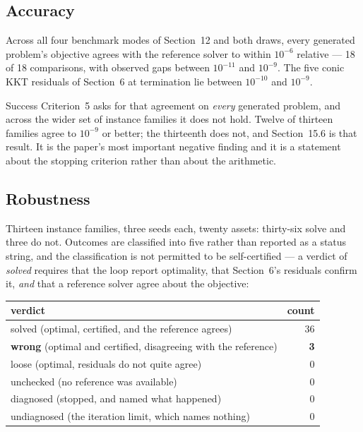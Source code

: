 \documentclass[11pt,a4paper]{article}
\begin{document}
\subsection{Accuracy}

Across all four benchmark modes of Section~12 and both draws, every
generated problem's objective agrees with the reference solver to
within $10^{-6}$ relative --- 18 of 18 comparisons, with observed gaps
between $10^{-11}$ and $10^{-9}$. The five conic KKT residuals of
Section~6 at termination lie between $10^{-10}$ and $10^{-9}$.

Success Criterion~5 asks for that agreement on \emph{every} generated
problem, and across the wider set of instance families it does not
hold. Twelve of thirteen families agree to $10^{-9}$ or better; the
thirteenth does not, and Section~15.6 is that result. It is the
paper's most important negative finding and it is a statement about
the stopping criterion rather than about the arithmetic.

\subsection{Robustness}

Thirteen instance families, three seeds each, twenty assets:
thirty-six solve and three do not. Outcomes are classified into five
rather than reported as a status string, and the classification is not
permitted to be self-certified --- a verdict of \emph{solved} requires
that the loop report optimality, that Section~6's residuals confirm
it, \emph{and} that a reference solver agree about the objective:

\begin{center}
\begin{tabular}{lr}
\hline
verdict & count\\
\hline
solved (optimal, certified, and the reference agrees) & 36\\
\textbf{wrong} (optimal and certified, disagreeing with the reference)
& \textbf{3}\\
loose (optimal, residuals do not quite agree) & 0\\
unchecked (no reference was available) & 0\\
diagnosed (stopped, and named what happened) & 0\\
undiagnosed (the iteration limit, which names nothing) & 0\\
\hline
\end{tabular}
\end{center}
\end{document}
